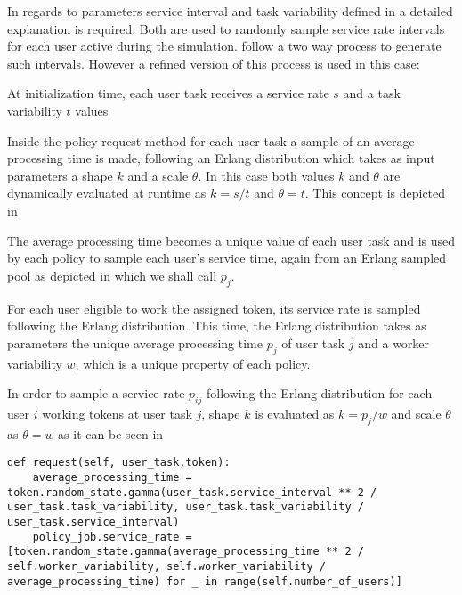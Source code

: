 In regards to parameters service interval and task variability defined in  a detailed explanation is required. Both are used to randomly sample service rate intervals for each user active during the simulation. \citet[p. 8]{Zeng2005} follow a two way process to generate such intervals. However a refined version of this process is used in this case:
\begin{enumerate*}
	\item At initialization time, each user task receives a service rate $s$ and a task variability $t$ values
	\item Inside the policy request method for each user task a sample of an average processing time is made, following an Erlang distribution which takes as input parameters a shape $k$ and a scale $\theta$. In this case both values $k$ and $\theta$ are dynamically evaluated at runtime as $k=s/t$ and $\theta = t$. This concept is depicted in 
	\item The average processing time becomes a unique value of each user task and is used by each policy to sample each user's service time, again from an Erlang sampled pool as depicted in  which we shall call $p_j$.
\end{enumerate*}

For each user eligible to work the assigned token, its service rate is sampled following the Erlang distribution. This time, the Erlang distribution takes as parameters the unique average processing time $p_j$ of user task $j$ and a worker variability $w$, which is a unique property of each policy.

In order to sample a service rate $p_{ij}$ following the Erlang distribution for each user $i$ working tokens at user task $j$, shape $k$ is evaluated as $k=p_j/w$ and scale $\theta$ as $\theta = w$ as it can be seen in 

\begin{lstlisting}[caption={User service rate sampling following an Erlang distribution where initially the average processing time is sampled. Afterwards, for each user a service time is sampled yet again relying on the formerly sampled average processing time and is assigned as an array to the policy job.},label=lst:user_service_rate,style=CustomPython]
def request(self, user_task,token):
    average_processing_time = token.random_state.gamma(user_task.service_interval ** 2 / user_task.task_variability, user_task.task_variability / user_task.service_interval)
    policy_job.service_rate = [token.random_state.gamma(average_processing_time ** 2 / self.worker_variability, self.worker_variability / average_processing_time) for _ in range(self.number_of_users)]
\end{lstlisting}

